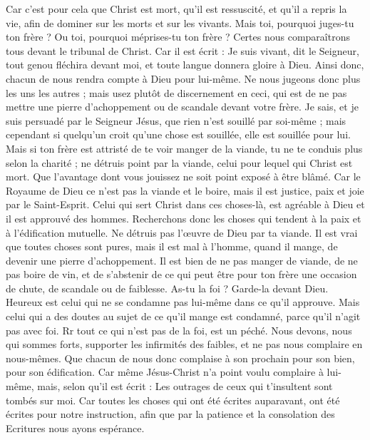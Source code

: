 \begin{multicols}{2}
Car c'est pour cela que Christ est mort, qu'il est ressuscité, et qu'il a repris la vie, afin de dominer sur les morts et sur les vivants.
Mais toi, pourquoi juges-tu ton frère ? Ou toi, pourquoi méprises-tu ton frère ? Certes nous comparaîtrons tous devant le tribunal de Christ.
Car il est écrit : Je suis vivant, dit le Seigneur, tout genou fléchira devant moi, et toute langue donnera gloire à Dieu.
 Ainsi donc, chacun de nous rendra compte à Dieu pour lui-même.
Ne nous jugeons donc plus les uns les autres ; mais usez plutôt de discernement en ceci, qui est de ne pas mettre une pierre d’achoppement ou de scandale devant votre frère.
Je sais, et je suis persuadé par le Seigneur Jésus, que rien n'est souillé par soi-même ; mais cependant si quelqu’un croit qu’une chose est souillée, elle est souillée pour lui.
Mais si ton frère est attristé de te voir manger de la viande, tu ne te conduis plus selon la charité ; ne détruis point par la viande, celui pour lequel qui Christ est mort.
Que l’avantage dont vous jouissez ne soit point exposé à être blâmé.
Car le Royaume de Dieu ce n'est pas la viande et le boire, mais il est justice, paix et joie par le Saint-Esprit.
Celui qui sert Christ dans ces choses-là, est agréable à Dieu et il est approuvé des hommes.
Recherchons donc les choses qui tendent à la paix et à l’édification mutuelle.
Ne détruis pas l’œuvre de Dieu par ta viande. Il est vrai que toutes choses sont pures, mais il est mal à l’homme, quand il mange, de devenir une pierre d’achoppement.
Il est bien de ne pas manger de viande, de ne pas boire de vin, et de s’abstenir de ce qui peut être pour ton frère une occasion de chute, de scandale ou de faiblesse.
As-tu la foi ? Garde-la devant Dieu. Heureux est celui qui ne se condamne pas lui-même dans ce qu'il approuve.
Mais celui qui a des doutes au sujet de ce qu’il mange est condamné, parce qu’il n’agit pas avec foi. Rr tout ce qui n’est pas de la foi, est un péché.
\VerseOne{}Nous devons, nous qui sommes forts, supporter les infirmités des faibles, et ne pas nous complaire en nous-mêmes.
Que chacun de nous donc complaise à son prochain pour son bien, pour son édification.
Car même Jésus-Christ n’a point voulu complaire à lui-même, mais, selon qu’il est écrit : Les outrages de ceux qui t’insultent sont tombés sur moi.
Car toutes les choses qui ont été écrites auparavant, ont été écrites pour notre instruction, afin que par la patience et la consolation des Ecritures nous ayons espérance.

\end{multicols}
